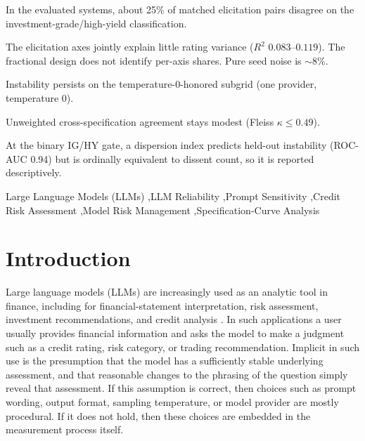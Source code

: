 \documentclass[a4paper,fleqn]{cas-sc}
\begin{document}
\begin{highlights}
\item In the evaluated systems, about 25\% of matched elicitation pairs disagree on the investment-grade/high-yield classification.
\item The elicitation axes jointly explain little rating variance ($R^2$ $0.083$--$0.119$). The fractional design does not identify per-axis shares. Pure seed noise is $\sim$8\%.
\item Instability persists on the temperature-0-honored subgrid (one provider, temperature 0).
\item Unweighted cross-specification agreement stays modest (Fleiss $\kappa\le0.49$).
\item At the binary IG/HY gate, a dispersion index predicts held-out instability (ROC-AUC 0.94) but is ordinally equivalent to dissent count, so it is reported descriptively.
\end{highlights}

\begin{keywords}
Large Language Models (LLMs) \sep LLM Reliability \sep Prompt Sensitivity \sep Credit Risk Assessment \sep Model Risk Management \sep Specification-Curve Analysis
\end{keywords}

\maketitle

\section{Introduction}
Large language models (LLMs) are increasingly used as an analytic tool in finance, including for
financial-statement interpretation, risk assessment, investment recommendations, and credit analysis
\citep{hens2025risk}. In such applications a user usually provides financial information and asks
the model to make a judgment such as a credit rating, risk category, or trading recommendation. Implicit
in such use is the presumption that the model has a sufficiently stable underlying assessment, and that
reasonable changes to the phrasing of the question simply reveal that assessment. If this assumption is
correct, then choices such as prompt wording, output format, sampling temperature, or model provider are
mostly procedural. If it does not hold, then these choices are embedded in the measurement process
itself.
\end{document}
